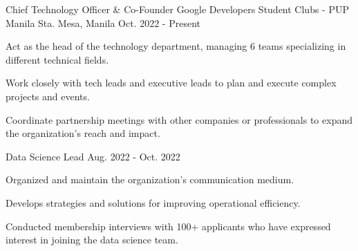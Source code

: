 

\begin{cventries}

  \cventry
    {Chief Technology Officer \& Co-Founder} %
    {Google Developers Student Clubs - PUP Manila} %
    {Sta. Mesa, Manila} %
    {Oct. 2022 - Present} %
    {
      \begin{cvitems} %
        \item {Act as the head of the technology department, managing 6 teams specializing in different technical fields.}
        \item {Work closely with tech leads and executive leads to plan and execute complex projects and events.}
        \item {Coordinate partnership meetings with other companies or professionals to expand the organization’s reach and impact.}
      \end{cvitems}
    }
    \cventry
    {Data Science Lead} %
    {} %
    {} %
    {Aug. 2022 - Oct. 2022} %
    {
      \begin{cvitems} %
        \item {Organized and maintain the organization's communication medium.}
        \item {Develops strategies and solutions for improving operational efficiency.}
        \item {Conducted membership interviews with 100+ applicants who have expressed interest in joining the data science team.}
      \end{cvitems}
    }


\end{cventries}
